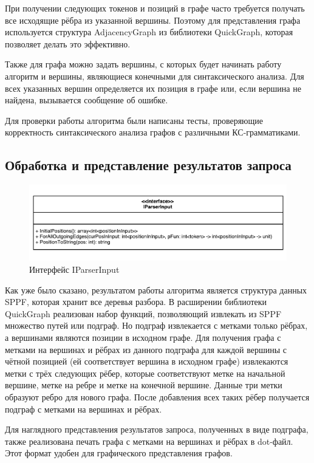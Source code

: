 \documentclass[14pt]{matmex-diploma}
\begin{document}
При получении следующих токенов и позиций в графе часто требуется получать все исходящие рёбра из указанной вершины. Поэтому для представления графа используется структура AdjacencyGraph из библиотеки QuickGraph, которая позволяет делать это эффективно.

Также для графа можно задать вершины, с которых будет начинать работу алгоритм и вершины, являющиеся конечными для синтаксического анализа. Для всех указанных вершин определяется их позиция в графе или, если вершина не найдена, вызывается сообщение об ошибке.

Для проверки работы алгоритма были написаны тесты, проверяющие корректность синтаксического анализа графов с различными КС-грамматиками.

\subsection{Обработка и представление результатов запроса}

\begin{figure}
\centering
\includegraphics[width=16cm]{images/IParserInput.pdf}
\caption{Интерфейс IParserInput}
\label{interface}
\end{figure}

Как уже было сказано, результатом работы алгоритма является структура данных SPPF, которая хранит все деревья разбора. В расширении библиотеки QuickGraph реализован набор функций,  позволяющий извлекать из SPPF множество путей или подграф. Но подграф извлекается с метками только рёбрах, а вершинами являются позиции в исходном графе. Для получения графа с метками на вершинах и рёбрах из данного подграфа для каждой вершины с чётной позицией (ей соответствует вершина в исходном графе) извлекаются метки с трёх следующих рёбер, которые соответствуют метке на начальной вершине, метке на ребре и метке на конечной вершине. Данные три метки образуют ребро для нового графа. После добавления всех таких рёбер получается подграф с метками на вершинах и рёбрах.

Для наглядного представления результатов запроса, полученных в виде подграфа, также реализована печать графа с метками на вершинах и рёбрах в dot-файл. Этот формат удобен для графического представления графов.
\end{document}
